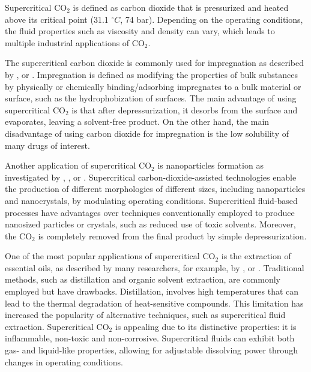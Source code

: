 \documentclass[../Article_Model_Parameters.tex]{subfiles}
\begin{document}
	
	Supercritical CO$_2$ is defined as carbon dioxide that is pressurized and heated above its critical point (31.1 $^\circ C$, 74 bar). Depending on the operating conditions, the fluid properties such as viscosity and density can vary, which leads to multiple industrial applications of CO$_2$.
		
	The supercritical carbon dioxide is commonly used for impregnation as described by \citet{Weidner2018}, \citet{Machado2022} or \citet{Fathi2022}. Impregnation is defined as modifying the properties of bulk substances by physically or chemically binding/adsorbing impregnates to a bulk material or surface, such as the hydrophobization of surfaces. The main advantage of using supercritical CO$_2$ is that after depressurization, it desorbs from the surface and evaporates, leaving a solvent-free product. On the other hand, the main disadvantage of using carbon dioxide for impregnation is the low solubility of many drugs of interest.
		
	Another application of supercritical CO$_2$ is nanoparticles formation as investigated by \citet{Padrela2018}, \citet{Franco2021}, \citet{SaadatiArdestani2020} or \citet{Sodeifian2022}. Supercritical carbon-dioxide-assisted technologies enable the production of different morphologies of different sizes, including nanoparticles and nanocrystals, by modulating operating conditions. Supercritical fluid-based processes have advantages over techniques conventionally employed to produce nanosized particles or crystals, such as reduced use of toxic solvents. Moreover, the CO$_2$ is completely removed from the final product by simple depressurization.
		
	One of the most popular applications of supercritical CO$_2$ is the extraction of essential oils, as described by many researchers, for example, by \citet{Sodeifian2017}, \citet{Reverchon1993} or \citet{Sovova1994}. Traditional methods, such as distillation and organic solvent extraction, are commonly employed but have drawbacks. Distillation, involves high temperatures that can lead to the thermal degradation of heat-sensitive compounds. This limitation has increased the popularity of alternative techniques, such as supercritical fluid extraction. Supercritical CO$_2$ is appealing due to its distinctive properties: it is inflammable, non-toxic and non-corrosive. Supercritical fluids can exhibit both gas- and liquid-like properties, allowing for adjustable dissolving power through changes in operating conditions. 
	
\end{document}
